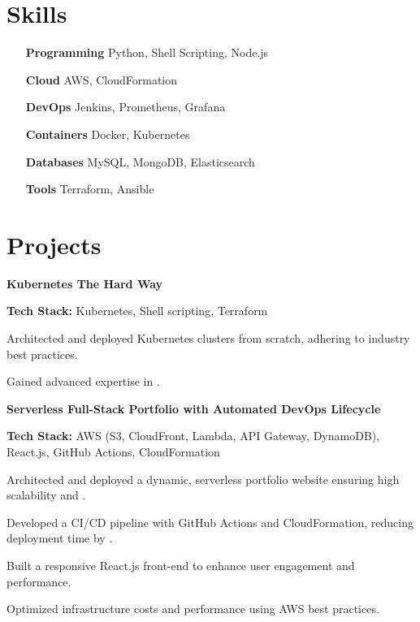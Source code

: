 \documentclass[letterpaper,10pt]{article}
\newcommand{\heading}[2]{
  \hspace{10pt}#1\hfill#2\\
}
\newcommand{\headingBf}[2]{
  \heading{\textbf{#1}}{\textbf{#2}}
}
\newenvironment{resume_list}{
  \vspace{-7pt}
  \begin{itemize}[itemsep=-2px, parsep=1pt, leftmargin=30pt]
}{
  \end{itemize}
}
\begin{document}
\section{Skills}
\begin{multicols}{2}
  \begin{itemize}[itemsep=-2px, parsep=1pt, leftmargin=75pt]
    \item[\textbf{Programming}] Python, Shell Scripting, Node.js
    \item[\textbf{Cloud}] AWS, CloudFormation
    \item[\textbf{DevOps}] Jenkins, Prometheus, Grafana
    \item[\textbf{Containers}] Docker, Kubernetes
    \item[\textbf{Databases}] MySQL, MongoDB, Elasticsearch
    \item[\textbf{Tools}] Terraform, Ansible
  \end{itemize}
\end{multicols}

\section{Projects}

\headingBf{Kubernetes The Hard Way \href{https://github.com/1md3nd/k8s}{\small\textit{\color{gray}{Link}}}}{}
\begin{resume_list}
  \item \textbf{Tech Stack:} Kubernetes, Shell scripting, Terraform 
  \item Architected and deployed Kubernetes clusters from scratch, adhering to industry best practices.
  \item Gained advanced expertise in \textbf{\color{accentTitle}{cluster management, scaling, and security configurations}}.
\end{resume_list}

\headingBf{Serverless Full-Stack Portfolio with Automated DevOps Lifecycle \href{https://github.com/1md3nd/portfolio}{\small\textit{\color{gray}{Link}}}}{}
\begin{resume_list}
  \item \textbf{Tech Stack:} AWS (S3, CloudFront, Lambda, API Gateway, DynamoDB), React.js, GitHub Actions, CloudFormation 
  \item Architected and deployed a dynamic, serverless portfolio website ensuring high scalability and \textbf{\color{accentTitle}{99.99\% uptime}}.
  \item Developed a CI/CD pipeline with GitHub Actions and CloudFormation, reducing deployment time by \textbf{\color{accentTitle}{50\%}}.
  \item Built a responsive React.js front-end to enhance user engagement and performance.
  \item Optimized infrastructure costs and performance using AWS best practices.
\end{resume_list}
\end{document}
